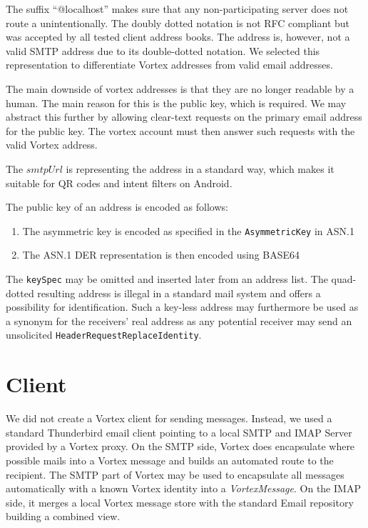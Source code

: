The suffix ``@localhost'' makes sure that any non-participating server does not route a \VortexMessage{} unintentionally. The doubly dotted notation is not RFC compliant but was accepted by all tested client address books. The address is, however, not a valid SMTP address due to its double-dotted notation. We selected this representation to differentiate Vortex addresses from valid email addresses.

The main downside of vortex addresses is that they are no longer readable by a human. The main reason for this is the public key, which is required. We may abstract this further by allowing clear-text requests on the primary email address for the public key. The vortex account must then answer such requests with the valid Vortex address.

The $smtpUrl$ is representing the address in a standard way, which makes it suitable for QR codes and intent filters on Android.

The public key of an address is encoded as follows:
\begin{enumerate}
	\item The asymmetric key is encoded as specified in the \texttt{AsymmetricKey} in ASN.1
	\item The ASN.1 DER representation is then encoded using BASE64
\end{enumerate}    

The \texttt{keySpec} may be omitted and inserted later from an address list. The quad-dotted resulting address is illegal in a standard mail system and offers a possibility for identification. Such a key-less address may furthermore be used as a synonym for the receivers' real address as any potential receiver may send an unsolicited \texttt{HeaderRequestReplaceIdentity}.

\section{Client}
We did not create a Vortex client for sending messages. Instead, we used a standard Thunderbird email client pointing to a local SMTP and IMAP Server provided by a Vortex proxy. On the SMTP side, Vortex does encapsulate where possible mails into a Vortex message and builds an automated route to the recipient. The SMTP part of Vortex may be used to encapsulate all messages automatically with a known Vortex identity into a \emph{VortexMessage}. On the IMAP side, it merges a local Vortex message store with the standard Email repository building a combined view.


